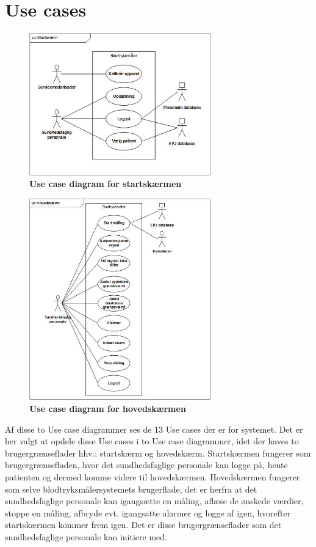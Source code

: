 \section{Use cases}
\begin{figure}[h!]
\includegraphics[width =0.7\textwidth , center]{billeder/UCStart}
\caption{\textbf{Use case diagram for startskærmen}}
\end{figure}
\begin{figure}[h!]
\includegraphics[width =0.7\textwidth , center]{billeder/UChoved}
\caption{\textbf{Use case diagram for hovedskærmen}}
\end{figure}
Af disse to Use case diagrammer ses de 13 Use cases der er for systemet. Det er her valgt at opdele disse Use cases i to Use case diagrammer, idet der haves to brugergrænseflader hhv.; startskærm og hovedskærm. Startskærmen fungerer som brugergrænsefladen, hvor det sundhedsfaglige personale kan logge på, hente patienten og dermed komme videre til hovedskærmen. Hovedskærmen fungerer som selve blodtryksmålersystemets brugerflade, det er herfra at det sundhedsfaglige personale kan igangsætte en måling, aflæse de ønskede værdier, stoppe en måling, afbryde evt. igangsatte alarmer og logge af igen, hvorefter startskærmen kommer frem igen. Det er disse brugergrænseflader som det sundhedsfaglige personale kan initiere med. \\

